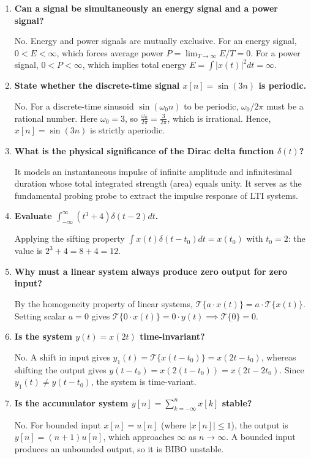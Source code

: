 \documentclass[12pt,a4paper]{article}
\newcommand{\Q}[1]{\textbf{#1}\par\noindent\ignorespaces}
\begin{document}
\begin{tcolorbox}[exambox, title={\textbf{Frequently Asked / Viva Questions}}]
\begin{enumerate}[topsep=0pt, label=\textbf{Q\arabic*.}, itemsep=5pt]
  \item \Q{Can a signal be simultaneously an energy signal and a power signal?}
  No. Energy and power signals are mutually exclusive. For an energy signal, $0 < E < \infty$, which forces average power $P = \lim_{T \to \infty} E/T = 0$. For a power signal, $0 < P < \infty$, which implies total energy $E = \int |x(t)|^2 dt = \infty$.

  \item \Q{State whether the discrete-time signal $x[n] = \sin(3n)$ is periodic.}
  No. For a discrete-time sinusoid $\sin(\omega_0 n)$ to be periodic, $\omega_0 / 2\pi$ must be a rational number. Here $\omega_0 = 3$, so $\frac{\omega_0}{2\pi} = \frac{3}{2\pi}$, which is irrational. Hence, $x[n] = \sin(3n)$ is strictly aperiodic.

  \item \Q{What is the physical significance of the Dirac delta function $\delta(t)$?}
  It models an instantaneous impulse of infinite amplitude and infinitesimal duration whose total integrated strength (area) equals unity. It serves as the fundamental probing probe to extract the impulse response of LTI systems.

  \item \Q{Evaluate $\int_{-\infty}^{\infty} (t^3 + 4) \delta(t - 2) dt$.}
  Applying the sifting property $\int x(t)\delta(t - t_0)dt = x(t_0)$ with $t_0 = 2$: the value is $2^3 + 4 = 8 + 4 = 12$.

  \item \Q{Why must a linear system always produce zero output for zero input?}
  By the homogeneity property of linear systems, $\mathcal{T}\{a \cdot x(t)\} = a \cdot \mathcal{T}\{x(t)\}$. Setting scalar $a = 0$ gives $\mathcal{T}\{0 \cdot x(t)\} = 0 \cdot y(t) \implies \mathcal{T}\{0\} = 0$.

  \item \Q{Is the system $y(t) = x(2t)$ time-invariant?}
  No. A shift in input gives $y_1(t) = \mathcal{T}\{x(t - t_0)\} = x(2t - t_0)$, whereas shifting the output gives $y(t - t_0) = x(2(t - t_0)) = x(2t - 2t_0)$. Since $y_1(t) \ne y(t - t_0)$, the system is time-variant.

  \item \Q{Is the accumulator system $y[n] = \sum_{k=-\infty}^n x[k]$ stable?}
  No. For bounded input $x[n] = u[n]$ (where $|x[n]| \le 1$), the output is $y[n] = (n+1)u[n]$, which approaches $\infty$ as $n \to \infty$. A bounded input produces an unbounded output, so it is BIBO unstable.


\end{enumerate}
\end{tcolorbox}
\end{document}
